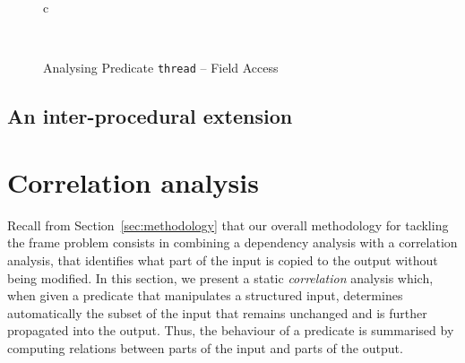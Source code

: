 \documentclass[11pt]{article}
\newcommand{\disp}[1]{\lstinline&#1&}
\begin{document}
\begin{figure}[htbp]
\begin{tabular}{c}
{
}\\
\bottomrule
\end{tabular}
\caption{Analysing Predicate \disp{thread} -- Field Access}
\label{intra:ss:struct}
\end{figure}


\subsection{An inter-procedural extension}

\section{Correlation analysis}


Recall from Section~\ref{sec:methodology} that our overall methodology
for tackling the frame problem consists in combining a dependency
analysis with a correlation analysis, that identifies what part of the
input is copied to the output without being modified. 
%
In this section, we present a static 
\emph{correlation} analysis which, when given a predicate that manipulates a 
structured input, determines automatically the subset of the input that remains 
unchanged and is further propagated into the output. Thus, the behaviour of a
predicate is summarised by computing relations between parts of the input and 
parts of the output. 

\end{document}
